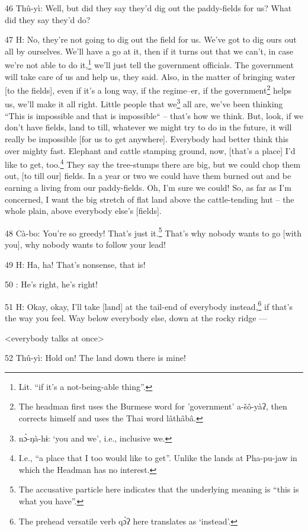 46 Thû-yì: Well, but did they say they'd dig out the paddy-fields for us? What
did they say they'd do?

47 H: No, they're not going to dig out the field for us. We've got to dig ours
out all by ourselves. We'll have a go at it, then if it turns out that we can't,
in case we're not able to do it,\footnote{Lit. ``if it's a not-being-able thing''.} we'll just tell the government officials.
The government will take care of us and help us, they said. Also, in the matter
of bringing water [to the fields], even if it's a long way, if the regime--er,
if the government\footnote{The headman first uses the Burmese word for 'government' a-šô-yàʔ, then corrects himself and uses the Thai word lâthâbâ.} helps us, we'll make it all right. Little people that we\footnote{nɔ̀-ŋà-hɨ: `you and we', i.e., inclusive we.}
all are, we've been thinking ``This is impossible and that is impossible``
-- that's how we think. But, look, if we don't have fields, land to till, whatever
we might try to do in the future, it will really be impossible [for us to get anywhere].
Everybody had better think this over mighty fast. Elephant and cattle stamping
ground, now, [that's a place] I'd like to get, too.\footnote{I.e., ``a place that I too would like to get''. Unlike the lands at Pha-pu-jaw in which the Headman has no interest.} They say the tree-stumps
there are big, but we could chop them out, [to till our] fields. In a year or two
we could have them burned out and be earning a living from our paddy-fields. Oh,
I'm sure we could! So, as far as I'm concerned, I want the big stretch of flat
land above the cattle-tending hut -- the whole plain, above everybody else's [fields].

48 Cà-bo: You're so greedy! That's just it.\footnote{The accusative particle here indicates that the underlying meaning is ``this is what you have''.} That's why nobody wants to go
[with you], why nobody wants to follow your lead!

49 H: Ha, ha! That's nonsense, that is!

50      : He's right, he's right!

51 H: Okay, okay, I'll take [land] at the tail-end of everybody instead,\footnote{The prehead versatile verb qɔ̀ʔ here translates as `instead'.} if
that's the way you feel. Way below everybody else, down at the rocky ridge ---

<everybody talks at once>

52 Thû-yì: Hold on! The land down there is mine!

